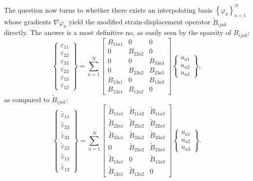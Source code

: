 The question now turns to whether there exists an interpolating basis $\left\{ \varphi_a \right\}_{a=1}^N$ whose gradients $\nabla \varphi_a$ yield the modified strain-displacement operator $\tilde{B}_{ijak}$ directly. The answer is a most definitive no, as easily seen by the sparsity of $B_{ijak}$:
\begin{equation}
  \left\{ \begin{array}{c} \varepsilon_{11} \\ \varepsilon_{22} \\ \varepsilon_{33} \\ \varepsilon_{23} \\ \varepsilon_{13} \\ \varepsilon_{12} \end{array} \right\} = \sum_{a = 1}^{N} \left[ \begin{array}{ccc} B_{11a1} & 0 & 0 \\ 0 & B_{22a2} & 0 \\ 0 & 0 & B_{33a3} \\ 0 & B_{23a2} & B_{23a3} \\ B_{13a1} & 0 & B_{13a3} \\ B_{12a1} & B_{12a2} & 0 \end{array} \right] \left\{ \begin{array}{c} u_{a1} \\ u_{a2} \\ u_{a3} \end{array} \right\},
\end{equation}
as compared to $\tilde{B}_{ijak}$:
\begin{equation}
  \left\{ \begin{array}{c} \tilde{\varepsilon}_{11} \\ \tilde{\varepsilon}_{22} \\ \tilde{\varepsilon}_{33} \\ \tilde{\varepsilon}_{23} \\ \tilde{\varepsilon}_{13} \\ \tilde{\varepsilon}_{12} \end{array} \right\} = \sum_{a = 1}^{N} \left[ \begin{array}{ccc} \tilde{B}_{11a1} & \tilde{B}_{11a2} & \tilde{B}_{11a3} \\ \tilde{B}_{22a1} & \tilde{B}_{22a2} & \tilde{B}_{22a3} \\ \tilde{B}_{33a1} & \tilde{B}_{33a2} & \tilde{B}_{33a3} \\ 0 & \tilde{B}_{23a2} & \tilde{B}_{23a3} \\ \tilde{B}_{13a1} & 0 & \tilde{B}_{13a3} \\ \tilde{B}_{12a1} & \tilde{B}_{12a2} & 0 \end{array} \right] \left\{ \begin{array}{c} u_{a1} \\ u_{a2} \\ u_{a3} \end{array} \right\}.
\end{equation}
